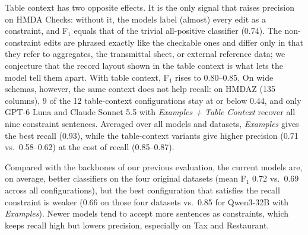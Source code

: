 Table context has two opposite effects. It is the only signal that raises
precision on HMDA Checks: without it, the models label (almost) every edit as a
constraint, and F$_1$ equals that of the trivial all-positive classifier (0.74).
The non-constraint edits are phrased exactly like the checkable ones and differ
only in that they refer to aggregates, the transmittal sheet, or external
reference data; we conjecture that the record layout shown in the table context
is what lets the model tell them apart. With table context, F$_1$ rises
to 0.80--0.85. On wide schemas, however, the same context does not
help recall: on HMDAZ (135 columns), 9 of the 12 table-context configurations
stay at or below 0.44, and only GPT-6 Luna and Claude Sonnet 5.5 with
\emph{Examples + Table Context} recover all nine constraint sentences. Averaged over all models and datasets, \emph{Examples} gives the best recall (0.93), while the table-context variants give higher precision (0.71 vs.\ 0.58--0.62) at the cost of recall (0.85--0.87).

Compared with the backbones of our previous evaluation, the current models are,
on average, better classifiers on the four original datasets (mean F$_1$ 0.72
vs.\ 0.69 across all configurations), but the best configuration that satisfies
the recall constraint is weaker (0.66 on those four datasets vs.\ 0.85 for
Qwen3-32B with \emph{Examples}). Newer models tend to accept more sentences as
constraints, which keeps recall high but lowers precision, especially on Tax and
Restaurant.
